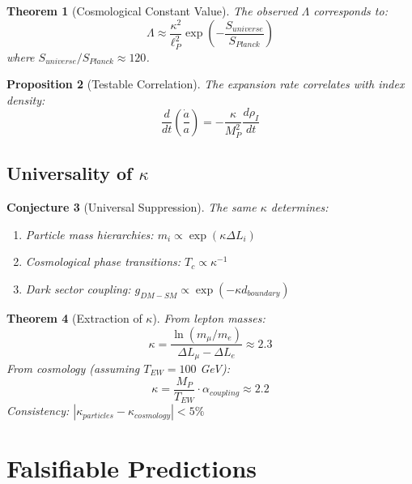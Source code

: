 \documentclass[11pt]{article}
\theoremstyle{plain}
\newtheorem{theorem}{Theorem}[section]
\newtheorem{proposition}[theorem]{Proposition}
\newtheorem{conjecture}[theorem]{Conjecture}
\theoremstyle{definition}
\begin{document}
\begin{theorem}[Cosmological Constant Value]
  The observed $\Lambda$ corresponds to:
  \begin{equation}
    \Lambda \approx \frac{\kappa^2}{\ell_P^2} \exp\left(-\frac{S_{universe}}{S_{Planck}}\right)
  \end{equation}
  where $S_{universe}/S_{Planck} \approx 120$.
\end{theorem}

\begin{proposition}[Testable Correlation]
  The expansion rate correlates with index density:
  \begin{equation}
    \frac{d}{dt}\left(\frac{\dot{a}}{a}\right) = -\frac{\kappa}{M_P^2} \frac{d\rho_I}{dt}
  \end{equation}
\end{proposition}

\subsection{Universality of $\kappa$}

\begin{conjecture}[Universal Suppression]
  The same $\kappa$ determines:
  \begin{enumerate}
    \item Particle mass hierarchies: $m_i \propto \exp(\kappa \Delta L_i)$
    \item Cosmological phase transitions: $T_c \propto \kappa^{-1}$
    \item Dark sector coupling: $g_{DM-SM} \propto \exp(-\kappa d_{boundary})$
  \end{enumerate}
\end{conjecture}

\begin{theorem}[Extraction of $\kappa$]
  From lepton masses:
  \begin{equation}
    \kappa = \frac{\ln(m_\mu/m_e)}{\Delta L_\mu - \Delta L_e} \approx 2.3
  \end{equation}
  From cosmology (assuming $T_{EW} = 100$ GeV):
  \begin{equation}
    \kappa = \frac{M_P}{T_{EW}} \cdot \alpha_{coupling} \approx 2.2
  \end{equation}
  Consistency: $|\kappa_{particles} - \kappa_{cosmology}| < 5\%$
\end{theorem}

\section{Falsifiable Predictions}
\label{sec:falsifiable}
\end{document}
